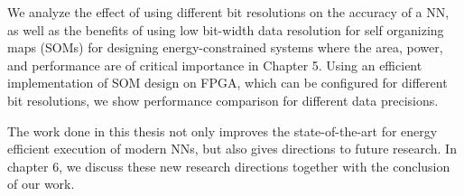 We analyze the effect of using different bit resolutions on the accuracy of a NN, as well as the benefits of using low bit-width data resolution for self organizing maps (SOMs) for designing energy-constrained systems where the area, power, and performance are of critical importance in Chapter 5. Using an efficient implementation of SOM design on FPGA, which can be configured for different bit resolutions, we show performance comparison for different data precisions. 
	
The work done in this thesis not only improves the state-of-the-art for energy efficient execution of modern NNs, but also gives directions to future research. In chapter 6, we discuss these new research directions together with the conclusion of our work.